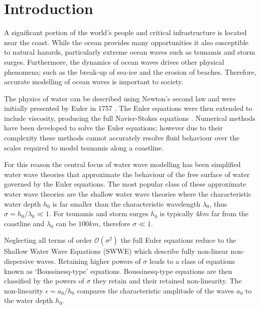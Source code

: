 \chapter{Introduction}
\label{chp:Introduction}

A significant portion of the world's people and critical infrastructure is located near the coast. While the ocean provides many opportunities it also susceptible to natural hazards, particularly extreme ocean waves such as tsunamis and storm surges. Furthermore, the dynamics of ocean waves drives other physical phenomena; such as the break-up of sea-ice and the erosion of beaches. Therefore, accurate modelling of ocean waves is important to society. 

The physics of water can be described using Newton's second law and were initially presented by Euler in 1757 \cite{Euler-1755-274}. The Euler equations were then extended to include viscosity, producing the full Navier-Stokes equations \cite{navier1823,stokes1845gg}. Numerical methods \cite{Chorin-1967-928,Taylor-Hood-1973-73,Bassi-1997-267} have been developed to solve the Euler equations; however due to their complexity these methods cannot accurately resolve fluid behaviour over the scales required to model tsunamis along a coastline. 

For this reason the central focus of water wave modelling has been simplified water wave theories that approximate the behaviour of the free surface of water governed by the Euler equations. The most popular class of these approximate water wave theories are the shallow water wave theories where the characteristic water depth $h_0$ is far smaller than the characteristic wavelength $\lambda_0$, thus $\sigma = h_0 / \lambda_0 \ll 1$. For tsunamis and storm surges $h_0$ is typically $4km$ far from the coastline and $\lambda_0$ can be $100km$, therefore $\sigma\ll 1$.

Neglecting all terms of order $\mathcal{O}\left(\sigma ^2\right)$ the full Euler equations reduce to the Shallow Water Wave Equations (SWWE) \cite{Bonneton-Lannes-2009-16601} which describe fully non-linear non-dispersive waves. Retaining higher powers of $\sigma$ leads to a class of equations known as `Boussinesq-type' equations. Boussinesq-type equations are then classified by the powers of $\sigma$ they retain and their retained non-linearity. The non-linearity $\epsilon= a_0 / h_0$ compares the characteristic amplitude of the waves $a_0$ to the water depth $h_0$. 


